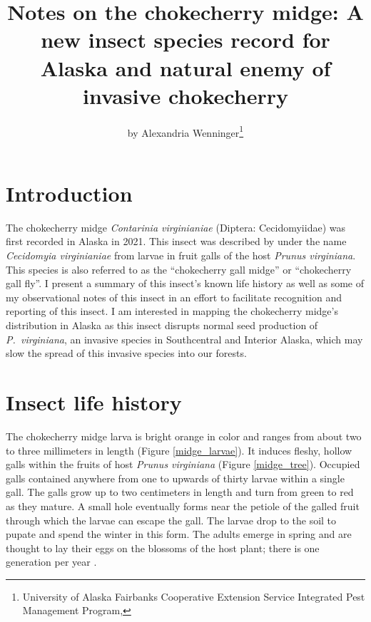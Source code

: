 \title{Notes on the chokecherry midge: A new insect species record for Alaska and natural enemy of invasive chokecherry}

\author{by Alexandria Wenninger\footnote{University of Alaska Fairbanks Cooperative Extension Service Integrated Pest Management Program, }}

\maketitle

\section{Introduction}

The chokecherry midge \textit{Contarinia virginianiae} (Diptera: Cecidomyiidae) was first recorded in Alaska in 2021. This insect was described by \citet{Felt1906} under the name \textit{Cecidomyia virginianiae} from larvae in fruit galls of the host \textit{Prunus virginiana}. This species is also referred to as the ``chokecherry gall midge'' or ``chokecherry gall fly''. I present a summary of this insect's known life history as well as some of my observational notes of this insect in an effort to facilitate recognition and reporting of this insect. I am interested in mapping the chokecherry midge's distribution in Alaska as this insect disrupts normal seed production of \textit{P.\ virginiana}, an invasive species in Southcentral and Interior Alaska, which may slow the spread of this invasive species into our forests. 

\section{Insect life history}

The chokecherry midge larva is bright orange in color and ranges from about two to three millimeters in length (Figure \ref{midge_larvae}). It induces fleshy, hollow galls within the fruits of host \textit{Prunus virginiana} (Figure \ref{midge_tree}). Occupied galls contained anywhere from one to upwards of thirty larvae within a single gall. The galls grow up to two centimeters in length and turn from green to red as they mature. A small hole eventually forms near the petiole of the galled fruit through which the larvae can escape the gall. The larvae drop to the soil to pupate and spend the winter in this form. The adults emerge in spring and are thought to lay their eggs on the blossoms of the host plant; there is one generation per year \citep{Cranshaw2004}. 

